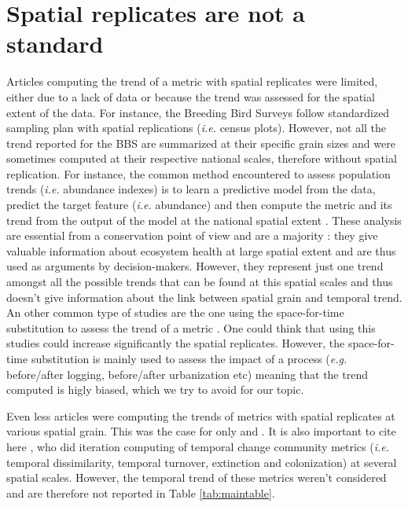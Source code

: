 \documentclass[
  12pt,
  oneside]{report}
\begin{document}
\hypertarget{spatial-replicates-are-not-a-standard}{%
\section{Spatial replicates are not a standard}\label{spatial-replicates-are-not-a-standard}}

Articles computing the trend of a metric with spatial replicates were limited, either due to a lack of data or because the trend was assessed for the spatial extent of the data. For instance, the Breeding Bird Surveys \autocites[\emph{e.g.}][]{sauer_north_2013,kamp_population_2021} follow standardized sampling plan with spatial replications (\emph{i.e.} census plots). However, not all the trend reported for the BBS are summarized at their specific grain sizes and were sometimes computed at their respective national scales, therefore without spatial replication. For instance, the common method encountered to assess population trends (\emph{i.e.} abundance indexes) is to learn a predictive model from the data, predict the target feature (\emph{i.e.} abundance) and then compute the metric and its trend from the output of the model at the national spatial extent \autocites[\emph{e.g.}][]{jiguet_modeling_2005,jiguet_french_2012,eglington_disentangling_2012,doxa_low-intensity_2010,sauer_first_2017}. These analysis are essential from a conservation point of view and are a majority \autocite{fraixedas_state_2020}: they give valuable information about ecosystem health at large spatial extent and are thus used as arguments by decision-makers. However, they represent just one trend amongst all the possible trends that can be found at this spatial scales and thus doesn't give information about the link between spatial grain and temporal trend. An other common type of studies are the one using the space-for-time substitution \autocite{walker_use_2010} to assess the trend of a metric \autocite[one of the best example is][]{hill_determining_2004}. One could think that using this studies could increase significantly the spatial replicates. However, the space-for-time substitution is mainly used to assess the impact of a process (\emph{e.g.} before/after logging, before/after urbanization etc) meaning that the trend computed is higly biased, which we try to avoid for our topic.

Even less articles were computing the trends of metrics with spatial replicates at various spatial grain. This was the case for only \textcite{chase_species_2019} and \textcite{jarzyna_taxonomic_2018}. It is also important to cite here \textcite{jarzyna_spatial_2015}, who did iteration computing of temporal change community metrics (\emph{i.e.} temporal dissimilarity, temporal turnover, extinction and colonization) at several spatial scales. However, the temporal trend of these metrics weren't considered and are therefore not reported in Table \ref{tab:maintable}.
\end{document}
